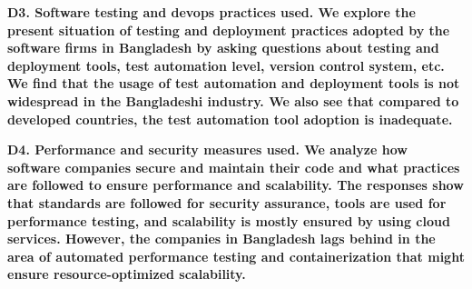 \nd\bf{D3. Software testing and devops practices used}. We explore the
present situation of testing and deployment practices adopted by the software
firms in Bangladesh by asking questions about testing and deployment tools, test
automation level, version control system, etc. We find
that the usage of test automation and deployment tools is not widespread in the
Bangladeshi industry. We also see that compared
to developed countries, the test automation tool adoption is inadequate. 

\nd\bf{D4. Performance and security measures used}. We analyze how
software companies secure and maintain their code and what practices are
followed to ensure performance and scalability. The responses show that
standards are followed for security assurance, tools are used for performance
testing, and scalability is mostly ensured by using cloud services. However, the companies in Bangladesh lags
behind in the area of automated performance testing and containerization that
might ensure resource-optimized scalability.

